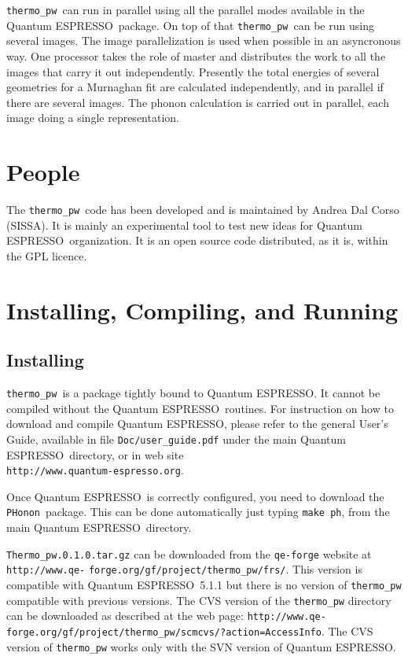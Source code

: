 \documentclass[12pt,a4paper]{article}
\def\qe{{\sc Quantum ESPRESSO}}
\def\PHonon{\texttt{PHonon}}
\def\thermo{\texttt{thermo\_pw}}
\begin{document}
\thermo\ can run in parallel using all the parallel modes available in
the \qe\ package. On top of that \thermo\ can be run using several images.
The image parallelization is used when possible in an asyncronous way.
One processor takes the role of master and distributes the work 
to all the images that carry it out independently. Presently 
the total energies of several geometries for a Murnaghan fit are
calculated independently, and in parallel if there are several images.  
The phonon calculation is carried out in parallel, each image doing 
a single representation.

\section{People}
The \thermo\ code has been developed and is maintained by Andrea Dal Corso 
(SISSA). It is mainly an experimental tool to test new ideas for \qe\ 
organization. It is an open source code distributed, as it is, within the GPL 
licence.  

\section{Installing, Compiling, and Running}

\subsection{Installing}

\thermo\ is a package tightly bound to \qe. It cannot be compiled without
the \qe\ routines. For instruction on how to download and compile \qe, please 
refer to the general User's Guide, available in file \texttt{Doc/user\_guide.pdf}
under the main \qe\ directory, or in web site \\
\texttt{http://www.quantum-espresso.org}.

Once \qe\ is correctly configured, you need to download the \PHonon\ 
package. This can be done automatically just typing \texttt{make ph}, from 
the main \qe\ directory.

\texttt{Thermo\_pw.0.1.0.tar.gz} can be downloaded from the 
\texttt{qe-forge} website at \texttt{http://www.qe-} \texttt{forge.org/gf/project/thermo\_pw/frs/}. This version is compatible with \qe\ 5.1.1
but there is no version of \texttt{thermo\_pw} compatible with previous
versions.
The CVS version of the \texttt{thermo\_pw} directory can be downloaded as 
described at
the web page: \texttt{http://www.qe-} \texttt{forge.org/gf/project/thermo\_pw/scmcvs/?action=AccessInfo}.
The CVS version of \texttt{thermo\_pw} works only with the SVN version of \qe. 
\end{document}
